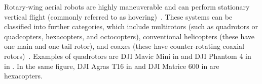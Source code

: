 Rotary-wing aerial robots are highly maneuverable and can perform stationary vertical flight (commonly referred to as hovering)~\citep{siciliano2016springer}. These systems can be classified into further categories, which include multirotors (such as quadrotors or quadcopters, hexacopters, and octocopters), conventional helicopters (these have one main and one tail rotor), and coaxes (these have counter-rotating coaxial rotors)~\citep{corke2017robotics}. Examples of quadrotors are DJI Mavic Mini in  and DJI Phantom 4 in  in . In the same figure, DJI Agras T16 in  and DJI Matrice 600 in  are hexacopters.

